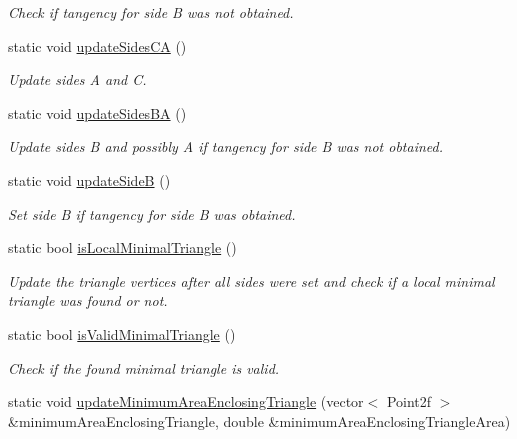 \begin{DoxyCompactItemize}
\begin{DoxyCompactList}\small\item\em Check if tangency for side B was not obtained. \end{DoxyCompactList}\item 
static void \hyperlink{classmultiscale_1_1MinimumAreaEnclosingTriangle_a8c906ab782ec5feb1767869a61d3620d}{update\-Sides\-C\-A} ()
\begin{DoxyCompactList}\small\item\em Update sides A and C. \end{DoxyCompactList}\item 
static void \hyperlink{classmultiscale_1_1MinimumAreaEnclosingTriangle_a20d737b8bb311c01d037062e98eb7efc}{update\-Sides\-B\-A} ()
\begin{DoxyCompactList}\small\item\em Update sides B and possibly A if tangency for side B was not obtained. \end{DoxyCompactList}\item 
static void \hyperlink{classmultiscale_1_1MinimumAreaEnclosingTriangle_a75d6c0769a2717ed7086b28be0db2440}{update\-Side\-B} ()
\begin{DoxyCompactList}\small\item\em Set side B if tangency for side B was obtained. \end{DoxyCompactList}\item 
static bool \hyperlink{classmultiscale_1_1MinimumAreaEnclosingTriangle_a729ba761fd35e6074be19959331ba465}{is\-Local\-Minimal\-Triangle} ()
\begin{DoxyCompactList}\small\item\em Update the triangle vertices after all sides were set and check if a local minimal triangle was found or not. \end{DoxyCompactList}\item 
static bool \hyperlink{classmultiscale_1_1MinimumAreaEnclosingTriangle_a522b2228b01e7d5fa6f922ba5f5394a6}{is\-Valid\-Minimal\-Triangle} ()
\begin{DoxyCompactList}\small\item\em Check if the found minimal triangle is valid. \end{DoxyCompactList}\item 
static void \hyperlink{classmultiscale_1_1MinimumAreaEnclosingTriangle_a13a71a75863ff3ccc9993e741086dbcf}{update\-Minimum\-Area\-Enclosing\-Triangle} (vector$<$ Point2f $>$ \&minimum\-Area\-Enclosing\-Triangle, double \&minimum\-Area\-Enclosing\-Triangle\-Area)

\end{DoxyCompactItemize}
